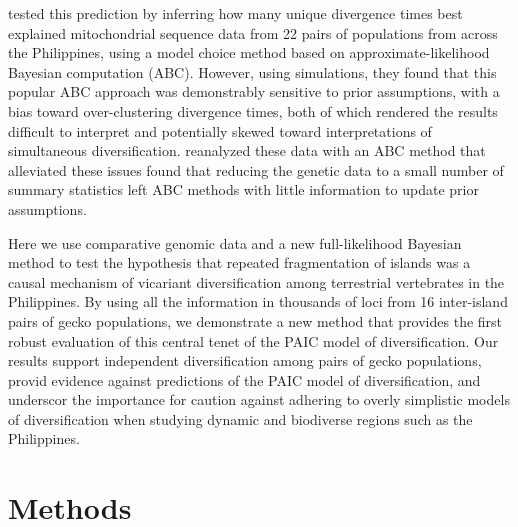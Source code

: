 \citet{Oaks2012}  tested this prediction  by inferring how many unique
divergence times best explained mitochondrial sequence data from 22 pairs of
populations from across the Philippines, using a model choice method based on
approximate-likelihood Bayesian computation (ABC).
However, using simulations, they found that this popular ABC approach was
demonstrably sensitive to prior assumptions, with a bias toward over-clustering
divergence times, both of which rendered the results difficult to interpret
and potentially skewed toward interpretations of simultaneous diversification.
\citet{Oaks2014dpp} reanalyzed these data with an ABC method that alleviated
these issues found that reducing the genetic data to a small
number of summary statistics left ABC methods with little information to update
prior assumptions.

Here we use comparative genomic data and a new full-likelihood Bayesian method
to test the hypothesis that repeated fragmentation of islands was a causal
mechanism of vicariant diversification among terrestrial vertebrates in the
Philippines.
By using all the information in thousands of loci from 16 inter-island
pairs of gecko populations,
we demonstrate a new method that provides the first robust evaluation of
this central tenet of the PAIC model of diversification.
Our results support independent diversification among pairs of gecko
populations,
provid evidence against  predictions of
the PAIC model of diversification,
and underscor the importance for caution against adhering to
overly simplistic models of diversification  when studying dynamic and biodiverse regions such as the
Philippines.


\section{Methods}

